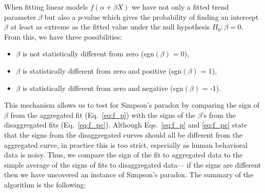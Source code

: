 
When fitting linear models $f(\alpha + \beta X)$ we have not only a fitted trend parameter $\beta$ but also a $p$-value which gives the probability of finding an intercept $\beta$ at least as extreme as the fitted value under the null hypothesis $H_0:\beta = 0$. From this, we have three possibilities:
\begin{itemize}
  \item $\beta$ is not statistically different from zero (sgn$(\beta)$ = 0), %
  \item $\beta$ is statistically different from zero and positive (sgn$(\beta)$ = 1), %
  \item $\beta$ is statistically different from zero and negative (sgn$(\beta)$ = -1).
\end{itemize}
This mechanism allows us to test for Simpson's paradox by comparing the sign of $\beta$ from the aggregated fit (Eq.~\eqref{eq:f_p}) with the signs of the $\beta$'s from the disaggregated fits (Eq.~\eqref{eq:f_pc}). %
{Although} Eqs.~\eqref{eq:f_p} and \eqref{eq:f_pc} %
{state that the signs from the disaggregated curves should all be different from the aggregated curve, in practice this is too strict, especially as human behavioral data is noisy. Thus, we compare the sign of the fit to aggregated data to the simple average of the signs of fits to disaggregated data--- if the signs are different then we have uncovered an instance of Simpson's paradox}. The summary of the algorithm is the following:

